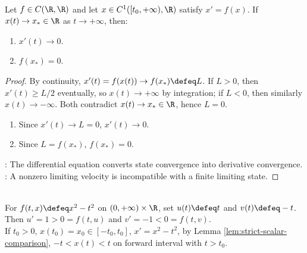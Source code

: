 \begin{lemma} \label{lem:autonomous-convergent-state-equilibrium} \\
Let $f\in C(\R,\R)$ and let $x\in C^1([t_0,+\infty),\R)$ satisfy $x'=f(x)$. If $x(t)\to x_*\in\R$ as $t\to+\infty$, then:
\begin{enumerate}[label=(\roman*)]
\setlength{\itemsep}{0pt}
\item $x'(t)\to0$.
\item $f(x_*)=0$.
\end{enumerate}
\begin{proof}
By continuity, $x'(t)=f(x(t))\to f(x_*)\defeq L$. If $L>0$, then $x'(t)\geq L/2$ eventually, so $x(t)\to+\infty$ by integration; if $L<0$, then similarly $x(t)\to-\infty$. Both contradict $x(t)\to x_*\in\R$, hence $L=0$.
\begin{enumerate}[label=(\roman*)]
\setlength{\itemsep}{0pt}
\item Since $x'(t)\to L=0$, $x'(t)\to0$.
\item Since $L=f(x_*)$, $f(x_*)=0$.
\end{enumerate}
: The differential equation converts state convergence into derivative convergence.\\
: A nonzero limiting velocity is incompatible with a finite limiting state.
\end{proof}
\end{lemma}

\begin{example} \label{ex:riccati-wedge-comparison} \\
For $f(t,x)\defeq x^2-t^2$ on $(0,+\infty)\times\R$, set $u(t)\defeq t$ and $v(t)\defeq -t$.\\
Then $u'=1>0=f(t,u)$ and $v'=-1<0=f(t,v)$.\\
If $t_0>0$, $x(t_0)=x_0\in[-t_0,t_0]$, $x'=x^2-t^2$, by Lemma \ref{lem:strict-scalar-comparison}, $-t<x(t)<t$ on forward interval with $t>t_0$.
\end{example}

